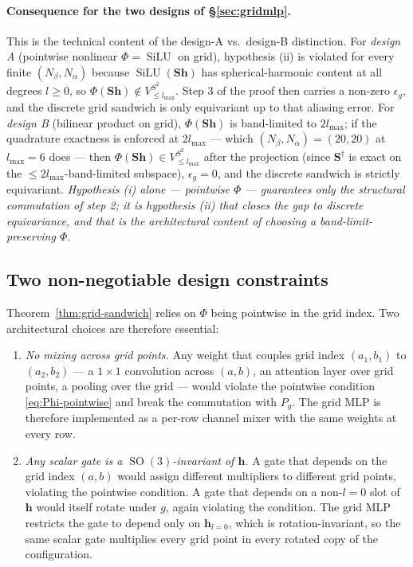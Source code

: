 \documentclass[11pt,a4paper]{article}
\DeclareMathOperator{\SO}{SO}
\DeclareMathOperator{\SiLU}{SiLU}
\newcommand{\Sph}{S^2}
\newcommand{\bh}{\bm{h}}
\newcommand{\lmax}{l_{\max}}
\theoremstyle{plain}
\theoremstyle{definition}
\theoremstyle{remark}
\begin{document}
\paragraph{Consequence for the two designs of \S\ref{sec:gridmlp}.}
This is the technical content of the design-A vs.\ design-B distinction.
For \emph{design A} (pointwise nonlinear $\Phi=\SiLU$ on grid), hypothesis (ii) is violated for every finite $(N_\beta,N_\alpha)$ because $\SiLU(\bm{S}\bh)$ has spherical-harmonic content at all degrees $l\ge 0$, so $\Phi(\bm{S}\bh)\notin V^{\Sph}_{\le\lmax}$.
Step 3 of the proof then carries a non-zero $\epsilon_g$, and the discrete grid sandwich is only equivariant up to that aliasing error.
For \emph{design B} (bilinear product on grid), $\Phi(\bm{S}\bh)$ is band-limited to $2\lmax$; if the quadrature exactness is enforced at $2\lmax$ — which $(N_\beta,N_\alpha)=(20,20)$ at $\lmax=6$ does — then $\Phi(\bm{S}\bh)\in V^{\Sph}_{\le\lmax}$ after the projection (since $\bm{S}^{\dagger}$ is exact on the $\le 2\lmax$-band-limited subspace), $\epsilon_g=0$, and the discrete sandwich is strictly equivariant.
\emph{Hypothesis (i) alone — pointwise $\Phi$ — guarantees only the structural commutation of step 2; it is hypothesis (ii) that closes the gap to discrete equivariance, and that is the architectural content of choosing a band-limit-preserving $\Phi$.}

\subsection{Two non-negotiable design constraints}\label{sec:constraints}

Theorem~\ref{thm:grid-sandwich} relies on $\Phi$ being pointwise in the grid
index. Two architectural choices are therefore essential:

\begin{enumerate}[leftmargin=2em]
    \item \emph{No mixing across grid points.}
          Any weight that couples grid index $(a_1,b_1)$ to $(a_2,b_2)$ — a $1\times 1$ convolution across $(a,b)$, an attention layer over grid points, a pooling over the grid — would violate the pointwise condition \eqref{eq:Phi-pointwise} and break the commutation with $P_g$.
          The grid MLP is therefore implemented as a per-row channel mixer with the same weights at every row.
    \item \emph{Any scalar gate is a $\SO(3)$-invariant of $\bh$.}
          A gate that depends on the grid index $(a,b)$ would assign different multipliers to different grid points, violating the pointwise condition.
          A gate that depends on a non-$l=0$ slot of $\bh$ would itself rotate under $g$, again violating the condition.
          The grid MLP restricts the gate to depend only on $\bh_{l=0}$, which is rotation-invariant, so the same scalar gate multiplies every grid point in every rotated copy of the configuration.
\end{enumerate}
\end{document}

